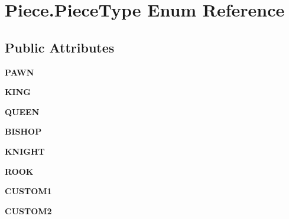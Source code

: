 \hypertarget{enumPiece_1_1PieceType}{\section{Piece.\-Piece\-Type Enum Reference}
\label{enumPiece_1_1PieceType}
}
\subsection*{Public Attributes}
\begin{DoxyCompactItemize}
\item 
\hypertarget{enumPiece_1_1PieceType_a22a73e8d262f5cc421f128d605b8e8a0}{{\bfseries P\-A\-W\-N}}\label{enumPiece_1_1PieceType_a22a73e8d262f5cc421f128d605b8e8a0}

\item 
\hypertarget{enumPiece_1_1PieceType_a902e7783cfc42ce970c54326fd2f9bb8}{{\bfseries K\-I\-N\-G}}\label{enumPiece_1_1PieceType_a902e7783cfc42ce970c54326fd2f9bb8}

\item 
\hypertarget{enumPiece_1_1PieceType_acf649c4e31e2a59d3efcdd4196eef415}{{\bfseries Q\-U\-E\-E\-N}}\label{enumPiece_1_1PieceType_acf649c4e31e2a59d3efcdd4196eef415}

\item 
\hypertarget{enumPiece_1_1PieceType_a590ebe229eabdc485f144ae10e7da926}{{\bfseries B\-I\-S\-H\-O\-P}}\label{enumPiece_1_1PieceType_a590ebe229eabdc485f144ae10e7da926}

\item 
\hypertarget{enumPiece_1_1PieceType_aa2bf36c04cf9471d4b7296ba01ae86d3}{{\bfseries K\-N\-I\-G\-H\-T}}\label{enumPiece_1_1PieceType_aa2bf36c04cf9471d4b7296ba01ae86d3}

\item 
\hypertarget{enumPiece_1_1PieceType_a0868ef692424d0bccb4b48bc1ae1181f}{{\bfseries R\-O\-O\-K}}\label{enumPiece_1_1PieceType_a0868ef692424d0bccb4b48bc1ae1181f}

\item 
\hypertarget{enumPiece_1_1PieceType_a8620850ef67f2e9f20462e405862cdb6}{{\bfseries C\-U\-S\-T\-O\-M1}}\label{enumPiece_1_1PieceType_a8620850ef67f2e9f20462e405862cdb6}

\item 
\hypertarget{enumPiece_1_1PieceType_aa5bb87cd301666515e4560bf4355a505}{{\bfseries C\-U\-S\-T\-O\-M2}}\label{enumPiece_1_1PieceType_aa5bb87cd301666515e4560bf4355a505}

\end{DoxyCompactItemize}


